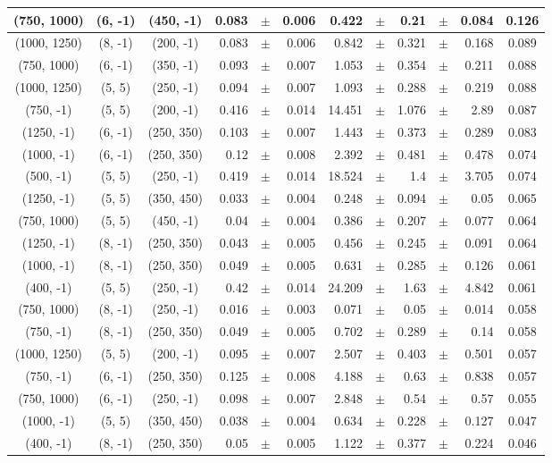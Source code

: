 \documentclass[12pt]{paper}
\begin{document}
\begin{table}[ht]
\begin{center}
{\begin{tabular}{|c|c|c|rrr|rrrrr|c|}
(750, 1000)&(6, -1)&(450, -1)&0.083&$\pm$&0.006&0.422&$\pm$&0.21&$\pm$&0.084&0.126\\\hline
(1000, 1250)&(8, -1)&(200, -1)&0.083&$\pm$&0.006&0.842&$\pm$&0.321&$\pm$&0.168&0.089\\\hline
(750, 1000)&(6, -1)&(350, -1)&0.093&$\pm$&0.007&1.053&$\pm$&0.354&$\pm$&0.211&0.088\\\hline
(1000, 1250)&(5, 5)&(250, -1)&0.094&$\pm$&0.007&1.093&$\pm$&0.288&$\pm$&0.219&0.088\\\hline
(750, -1)&(5, 5)&(200, -1)&0.416&$\pm$&0.014&14.451&$\pm$&1.076&$\pm$&2.89&0.087\\\hline
(1250, -1)&(6, -1)&(250, 350)&0.103&$\pm$&0.007&1.443&$\pm$&0.373&$\pm$&0.289&0.083\\\hline
(1000, -1)&(6, -1)&(250, 350)&0.12&$\pm$&0.008&2.392&$\pm$&0.481&$\pm$&0.478&0.074\\\hline
(500, -1)&(5, 5)&(250, -1)&0.419&$\pm$&0.014&18.524&$\pm$&1.4&$\pm$&3.705&0.074\\\hline
(1250, -1)&(5, 5)&(350, 450)&0.033&$\pm$&0.004&0.248&$\pm$&0.094&$\pm$&0.05&0.065\\\hline
(750, 1000)&(5, 5)&(450, -1)&0.04&$\pm$&0.004&0.386&$\pm$&0.207&$\pm$&0.077&0.064\\\hline
(1250, -1)&(8, -1)&(250, 350)&0.043&$\pm$&0.005&0.456&$\pm$&0.245&$\pm$&0.091&0.064\\\hline
(1000, -1)&(8, -1)&(250, 350)&0.049&$\pm$&0.005&0.631&$\pm$&0.285&$\pm$&0.126&0.061\\\hline
(400, -1)&(5, 5)&(250, -1)&0.42&$\pm$&0.014&24.209&$\pm$&1.63&$\pm$&4.842&0.061\\\hline
(750, 1000)&(8, -1)&(250, -1)&0.016&$\pm$&0.003&0.071&$\pm$&0.05&$\pm$&0.014&0.058\\\hline
(750, -1)&(8, -1)&(250, 350)&0.049&$\pm$&0.005&0.702&$\pm$&0.289&$\pm$&0.14&0.058\\\hline
(1000, 1250)&(5, 5)&(200, -1)&0.095&$\pm$&0.007&2.507&$\pm$&0.403&$\pm$&0.501&0.057\\\hline
(750, -1)&(6, -1)&(250, 350)&0.125&$\pm$&0.008&4.188&$\pm$&0.63&$\pm$&0.838&0.057\\\hline
(750, 1000)&(6, -1)&(250, -1)&0.098&$\pm$&0.007&2.848&$\pm$&0.54&$\pm$&0.57&0.055\\\hline
(1000, -1)&(5, 5)&(350, 450)&0.038&$\pm$&0.004&0.634&$\pm$&0.228&$\pm$&0.127&0.047\\\hline
(400, -1)&(8, -1)&(250, 350)&0.05&$\pm$&0.005&1.122&$\pm$&0.377&$\pm$&0.224&0.046\\\hline

\end{tabular}}
\end{center}
\end{table}
\end{document}
